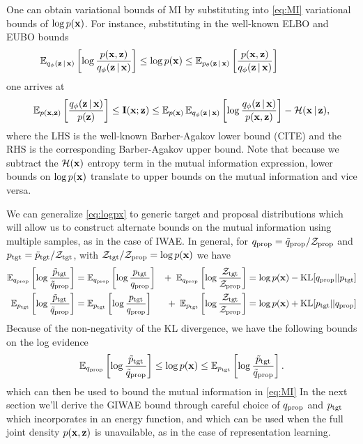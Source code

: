 One can obtain variational bounds of MI by substituting into \cref{eq:MI} variational bounds of $\log \px$. For instance, substituting in the well-known \gls{ELBO} and \gls{EUBO} bounds 
\begin{align}
\label{eq:logpx}
\E_{\qzx}\left[\log \frac{\joint}{\qzx}\right] \le \log \px \le \E_{\pzx}\left[\frac{\joint}{\qzx}\right] \phantom{- \mathcal{H}(\vx|\vz),} 
\end{align}
one arrives at 
\begin{align}
     \E_{\joint}\left[\frac{\qzx}{\pz}\right] \le \mathbf{I}(\vx ; \vz) \le \E_{\px}\E_{\qzx}\left[\log \frac{\qzx}{\joint}\right] - \mathcal{H}(\vx|\vz),
\end{align}
where the LHS is the well-known Barber-Agakov lower bound (CITE) and the RHS is the corresponding Barber-Agakov upper bound. Note that because we subtract the $\mathcal{H}(\vx)$ entropy term in the mutual information expression, lower bounds on $ \log \px$ translate to upper bounds on the mutual information and vice versa. 

We can generalize \cref{eq:logpx} to generic target and proposal distributions which will allow us to construct alternate bounds on the mutual information using multiple samples, as in the case of \gls{IWAE}. In general, for $\prop = \tprop / \Zprop$ and $\tgt = \ttgt / \Ztgt$, with $\Ztgt / \Zprop = \log \px$ we have 
\begin{alignat}{3}
    \E_{\prop}\left[\log \frac{\ttgt}{\tprop}\right]  &= \E_{\prop}\left[\log \frac{\tgt}{\prop}\right] &+~ \E_{\prop}\left[\log \frac{\Ztgt}{\Zprop}\right] &=  \log \px - \kl[\prop || \tgt]\\
    \E_{\tgt}\left[\log \frac{\ttgt}{\tprop}\right] &= \E_{\tgt}\left[\log \frac{\tgt}{\prop}\right] &+~ \E_{\tgt}\left[\log \frac{\Ztgt}{\Zprop}\right] &=  \log \px + \kl[\tgt || \prop] 
\end{alignat}
Because of the non-negativity of the KL divergence, we have the following bounds on the log evidence
\begin{align}
    \E_{\prop}\left[\log \frac{\ttgt}{\tprop}\right] \le \log \px \le \E_{\tgt}\left[\log \frac{\ttgt}{\tprop}\right].
\end{align}
which can then be used to bound the mutual information in \cref{eq:MI} In the next section we'll derive the \gls{GIWAE} bound through careful choice of $\prop$ and $\tgt$ which incorporates in an energy function, and which can be used when the full joint density $\joint$ is unavailable, as in the case of representation learning.  

